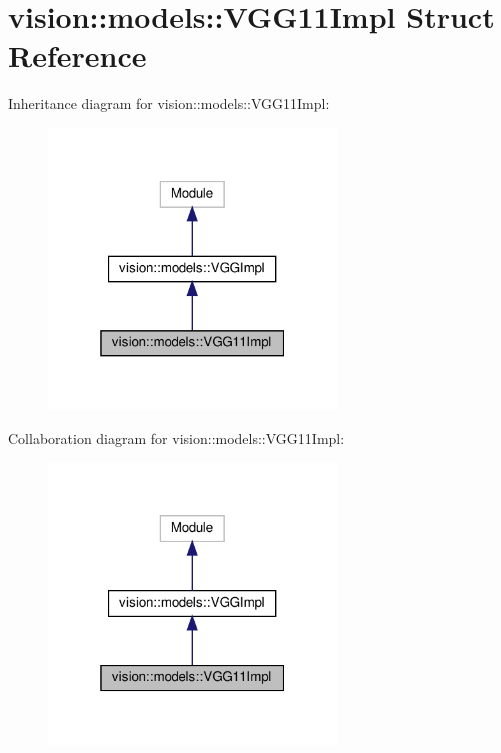 \hypertarget{structvision_1_1models_1_1VGG11Impl}{}\section{vision\+:\+:models\+:\+:V\+G\+G11\+Impl Struct Reference}
\label{structvision_1_1models_1_1VGG11Impl}


Inheritance diagram for vision\+:\+:models\+:\+:V\+G\+G11\+Impl\+:
\nopagebreak
\begin{figure}[H]
\begin{center}
\leavevmode
\includegraphics[width=217pt]{structvision_1_1models_1_1VGG11Impl__inherit__graph}
\end{center}
\end{figure}


Collaboration diagram for vision\+:\+:models\+:\+:V\+G\+G11\+Impl\+:
\nopagebreak
\begin{figure}[H]
\begin{center}
\leavevmode
\includegraphics[width=217pt]{structvision_1_1models_1_1VGG11Impl__coll__graph}
\end{center}
\end{figure}
